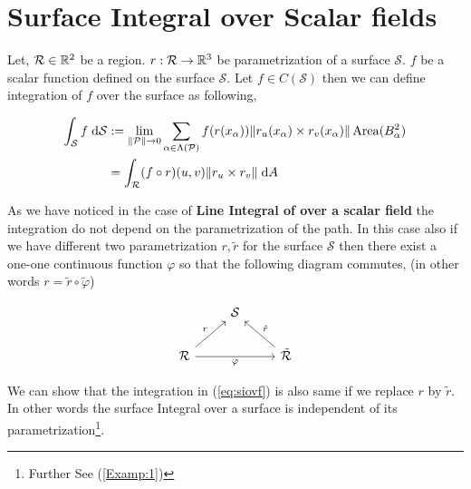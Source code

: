 \documentclass[../Analysis-3]{subfiles}
\begin{document}
\section{Surface Integral over Scalar fields}

Let, $\mathcal{R} \in \mathbb{R}^2$ be a region. $r:\mathcal{R} \to \mathbb{R}^3$ be parametrization of a surface $\mathcal{S}$. $f$ be a scalar function defined on the surface $\mathcal{S}$. Let $f \in C(\mathcal{S})$ then we can define integration of $f$ over the surface as following,

\begin{align}
    \int_{\mathcal{S}} f \hspace{0.1cm} \dd \mathcal{S} & := \lim_{\norm{\mathcal{P}} \to 0} \sum_{\alpha \in \Lambda (\mathcal{P})} f(r(x_{\alpha})) \norm{r_u(x_{\alpha}) \times r_v(x_{\alpha})} \operatorname{Area}(B_{\alpha}^2) \nonumber \\
                                                        & = \int_{\mathcal{R}} (f \circ r)(u,v) \norm{r_u \times r_v} \hspace{0.1cm} \dd A \label{eq:siovf}
\end{align}

As we have noticed in the case of \textbf{Line Integral of over a scalar field} the integration do not depend on the parametrization of the path. In this case also if we have different two parametrization $r, \tilde{r}$ for the surface $\mathcal{S}$ then there exist a one-one continuous function $\varphi$ so that the following diagram commutes, (in other words $r = \tilde{r} \circ \tilde{\varphi}$)

\[\begin{tikzcd}
        & {\mathcal{S}} \\
        {\mathcal{R}} && {\tilde{\mathcal{R}}}
        \arrow["r", from=2-1, to=1-2]
        \arrow["{\tilde{r}}"', from=2-3, to=1-2]
        \arrow["\varphi"', from=2-1, to=2-3]
    \end{tikzcd}\]

We can show that the integration in (\ref{eq:siovf}) is also same if we replace $r$ by $\tilde{r}$. In other words the surface Integral over a surface is independent of its parametrization\footnote{Further See (\ref{Examp:1})}.
\end{document}
